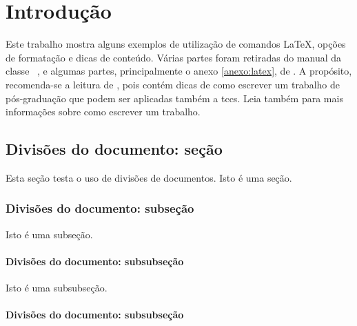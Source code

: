 \chapter{Introdução}\label{introducao}

Este trabalho mostra alguns exemplos de utilização de comandos \LaTeX, opções de formatação e dicas de conteúdo.
  Várias partes foram retiradas do manual da classe \abnTeX~\cite{abntex2classe,abntex2cite}, e algumas partes, principalmente o anexo \ref{anexo:latex}, de \cite{Moro2012}.
  A propósito, recomenda-se a leitura de \cite{Moro2012}, pois contém dicas de como escrever um trabalho de pós-graduação que podem ser aplicadas também a \acp{tcc}.
  Leia também \cite{SisbiUnipampa2011} para mais informações sobre como escrever um trabalho.


\section{Divisões do documento: seção}\label{sec:divisoes}

Esta seção testa o uso de divisões de documentos. Isto é uma seção.


\subsection{Divisões do documento: subseção}

Isto é uma subseção.


\subsubsection{Divisões do documento: subsubseção}

Isto é uma subsubseção.


\subsubsection{Divisões do documento: subsubseção}

